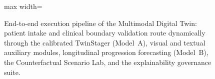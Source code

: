 \documentclass[11pt,a4paper]{article}
\begin{document}
\begin{figure}[t]
\begin{adjustbox}{max width=\linewidth}
\end{adjustbox}
\caption{End-to-end execution pipeline of the Multimodal Digital Twin: patient intake and clinical boundary validation route dynamically through the calibrated TwinStager (Model~A), visual and textual auxiliary modules, longitudinal progression forecasting (Model~B), the Counterfactual Scenario Lab, and the explainability governance suite.}
\label{fig:pipeline_flow}
\end{figure}
\end{document}
